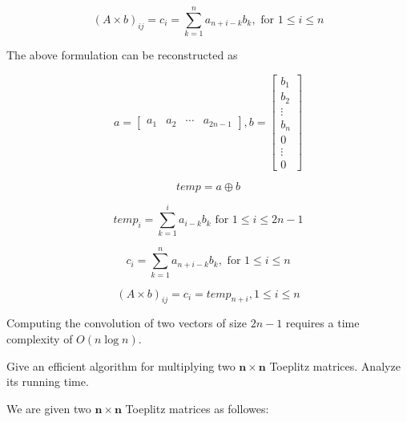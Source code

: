 $$(A\times b)_{i j}=c_{i} = \sum_{k=1}^{n}{a_{n+i-k}b_{k}},  \text { for }1\leq i \leq n$$

The above formulation can be reconstructed as 

$$a=\begin{bmatrix} a_1& a_2 & \cdots & a_{2n-1} \end{bmatrix}, b=\begin{bmatrix} b_1\\ b_2 \\ \vdots \\b_{n} \\ 0 \\ \vdots \\ 0 \end{bmatrix}$$

$$temp = a \oplus b$$

$$temp_{i} = \sum_{k=1}^{i} a_{i-k} b_{k} \text { for } 1 \leq i \leq 2n-1$$

$$c_{i} = \sum_{k=1}^{n}{a_{n+i-k}b_{k}}, \text { for } 1\leq i \leq n$$

$$(A\times b)_{i j}=c_{i} =temp_{n+i}, 1\le i \le n$$



Computing the convolution of two vectors of size $2n-1$ requires a time complexity of $O(n \log n)$.




Give an efficient algorithm for multiplying two $\boldsymbol{n} \times \boldsymbol{n}$ Toeplitz matrices. Analyze its running time.

\solution


We are given two $\boldsymbol{n} \times \boldsymbol{n}$ Toeplitz matrices as followes:

